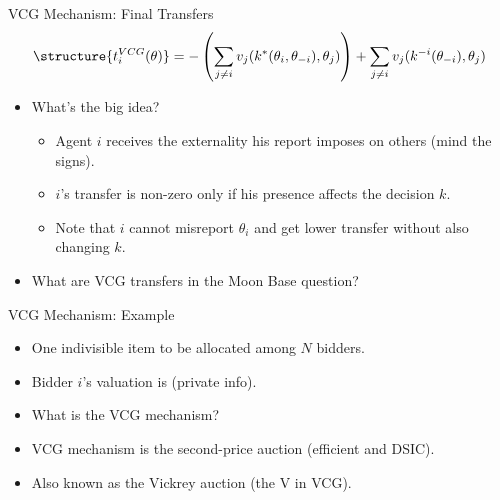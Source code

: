 \documentclass[english,10pt
,aspectratio=169
]{beamer}
\begin{document}
\begin{frame}{VCG Mechanism: Final Transfers}
\begin{align*}
\structure{ t_{i}^{VCG}(\theta) } = -\left(\sum_{j\neq i} v_{j}(k^*(\theta_i, \theta_{-i}), \theta_{j}) \right) + \sum_{j\neq i} v_{j}(k^{-i}(\theta_{-i}), \theta_{j})
\end{align*}
\begin{itemize}
	\item What's the big idea?
	\begin{itemize}
		\item Agent $i$ receives the externality his report imposes on others (mind the signs).
		\item $i$'s transfer is non-zero only if his presence affects the decision $k$.
		\item Note that $i$ cannot misreport $\theta_i$ and get lower transfer without also changing $k$.
	\end{itemize}
	\item What are VCG transfers in the Moon Base question?
\end{itemize}
\end{frame}

\begin{frame}{VCG Mechanism: Example}
\begin{example}[Auction]
	\begin{itemize}
		\item One indivisible item to be allocated among $N$ bidders.
		\item Bidder $i$'s valuation is  (private info).
		\item What is the VCG mechanism?
	\end{itemize}
\end{example}
\begin{itemize}
	\item VCG mechanism is the second-price auction (efficient and DSIC).
	\item Also known as the Vickrey auction (the V in VCG).
\end{itemize}
\end{frame}
\end{document}
